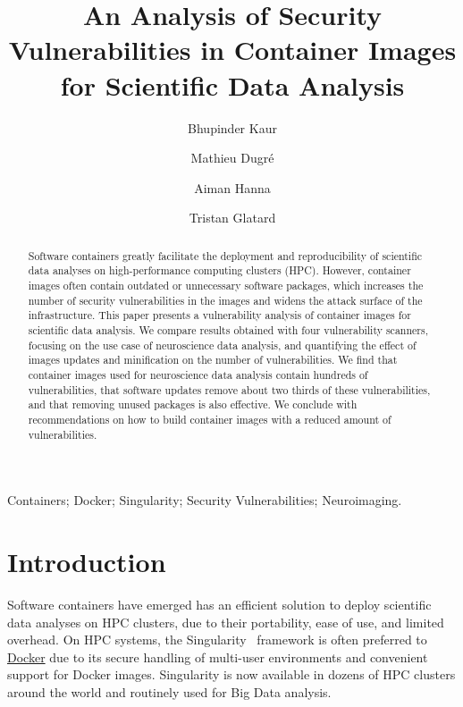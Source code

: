 \documentclass[a4paper,num-refs]{oup-contemporary}
\title{An Analysis of Security Vulnerabilities in Container Images for Scientific Data Analysis}
\begin{document}
\author{Bhupinder Kaur}
\author{Mathieu Dugr\'e}
\author{Aiman Hanna}
\author{Tristan Glatard}


\maketitle

\begin{abstract}
Software containers greatly facilitate the deployment and reproducibility
of scientific data analyses on high-performance computing clusters
(HPC). However, container images often contain outdated or unnecessary
software packages, which increases the number of security vulnerabilities
in the images and widens the attack surface of the infrastructure. This
paper presents a vulnerability analysis of container images for scientific
data analysis. We compare results obtained with four vulnerability
scanners, focusing on the use case of neuroscience data analysis, and
quantifying the effect of images updates and minification on the number of
vulnerabilities. We find that container images used for neuroscience data analysis
contain hundreds of vulnerabilities, that software updates remove about two
thirds of these vulnerabilities, and that removing unused packages is also
effective. We conclude with recommendations on how to build container
images with a reduced amount of vulnerabilities.

\end{abstract}

\begin{keywords}
Containers; Docker; Singularity; Security Vulnerabilities; Neuroimaging.
\end{keywords}

\section{Introduction}

Software containers have emerged has an efficient solution to deploy
scientific data analyses on HPC clusters, due
to their portability, ease of use, and limited overhead. On HPC systems, the
Singularity~\cite{kurtzer2017singularity} framework is often preferred to
\href{http://docker.com}{Docker} due to its
secure handling of multi-user environments and convenient support for
Docker images. Singularity is now available in dozens of HPC
clusters around the world and routinely used for Big Data analysis.
\end{document}
